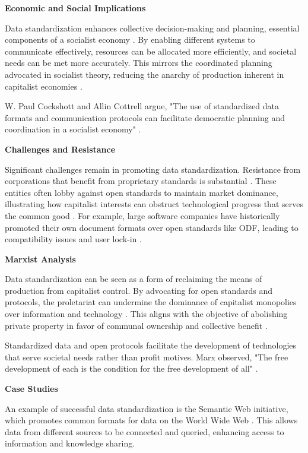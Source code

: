 \begin{refsection}
\textbf{Economic and Social Implications}

Data standardization enhances collective decision-making and planning, essential components of a socialist economy \cite[pp.~64-65]{Cockshott1993}. By enabling different systems to communicate effectively, resources can be allocated more efficiently, and societal needs can be met more accurately. This mirrors the coordinated planning advocated in socialist theory, reducing the anarchy of production inherent in capitalist economies \cite[pp.~477-478]{Marx2008}.

W. Paul Cockshott and Allin Cottrell argue, "The use of standardized data formats and communication protocols can facilitate democratic planning and coordination in a socialist economy" \cite[pp.~70]{Cockshott1993}.

\textbf{Challenges and Resistance}

Significant challenges remain in promoting data standardization. Resistance from corporations that benefit from proprietary standards is substantial \cite[pp.~73-74]{Stallman2010}. These entities often lobby against open standards to maintain market dominance, illustrating how capitalist interests can obstruct technological progress that serves the common good \cite[pp.~62-64]{Lessig2006}. For example, large software companies have historically promoted their own document formats over open standards like ODF, leading to compatibility issues and user lock-in \cite[pp.~15-17]{Ghosh2005}.

\textbf{Marxist Analysis}

Data standardization can be seen as a form of reclaiming the means of production from capitalist control. By advocating for open standards and protocols, the proletariat can undermine the dominance of capitalist monopolies over information and technology \cite[pp.~172-173]{Marx2008}. This aligns with the objective of abolishing private property in favor of communal ownership and collective benefit \cite[pp.~34-35]{Marx1974}.

Standardized data and open protocols facilitate the development of technologies that serve societal needs rather than profit motives. Marx observed, "The free development of each is the condition for the free development of all" \cite[pp.~105]{Marx1974}.

\textbf{Case Studies}

An example of successful data standardization is the Semantic Web initiative, which promotes common formats for data on the World Wide Web \cite[pp.~30-32]{BernersLee2001}. This allows data from different sources to be connected and queried, enhancing access to information and knowledge sharing.


\end{refsection}
